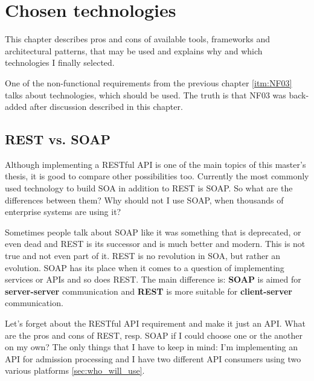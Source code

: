 \chapter{Chosen technologies}\label{cha:technologies}

	This chapter describes pros and cons of available tools, frameworks and architectural patterns, that may be used and
	explains why and which technologies I finally selected.
	
	One of the non-functional requirements from the previous chapter \ref{itm:NF03} talks about technologies, which should
	be used. The truth is that NF03 was back-added after discussion described in this chapter.

	\section{REST vs. SOAP}
	
	Although implementing a RESTful API is one of the main topics of this master's thesis, it is good to compare other
	possibilities too. Currently the most commonly used technology to build SOA in addition to REST is SOAP. So what are
	the differences between them? Why should not I use SOAP, when thousands of enterprise systems are using it?
	
	Sometimes people talk about SOAP like it was something that is deprecated, or even dead and REST is its successor and
	is much better and modern. This is not true and not even part of it. REST is no revolution in SOA, but rather
	an evolution. SOAP has its place when it comes to a question of implementing services or APIs and so does REST. The
	main difference is: \textbf{SOAP} is aimed for \textbf{server-server} communication and \textbf{REST} is more suitable
	for \textbf{client-server} communication.
	
	Let's forget about the RESTful API requirement and make it just an API. What are the pros and cons of REST, resp. SOAP
	if I could choose one or the another on my own? The only things that I have to keep in mind: I'm implementing an API
	for admission processing and I have two different API consumers using two various platforms \ref{sec:who_will_use}.
	
